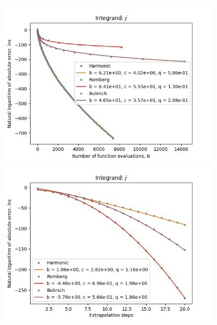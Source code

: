 \begin{figure}[H]
\centering
\begin{minipage}{0.45\textwidth}
\centering
\includegraphics[scale=0.45]{../results/romberg_plots/gaussian_hp_trend.png}
\end{minipage}
\begin{minipage}{0.45\textwidth}
\centering
\includegraphics[scale=0.45]{../results/romberg_plots/gaussian_hp_steps.png}
\end{minipage}
\end{figure}

